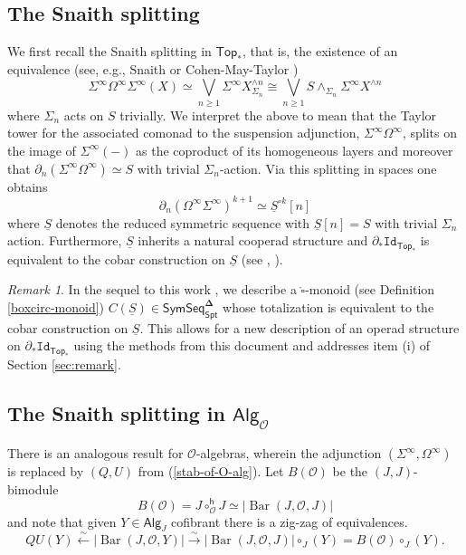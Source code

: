 \documentclass[11pt]{amsart}
\theoremstyle{definition}
\theoremstyle{remark}
\newtheorem{remark}[subsection]{Remark}
\newcommand{\Top}{\mathsf{Top}_*}
\newcommand{\Spt}{\mathsf{Spt}}
\newcommand{\Sp}{\Sigma^{\infty}}
\newcommand{\U}{\Omega^{\infty}}
\newcommand{\Alg}[1]{ {\mathsf{Alg}_{\mathcal{#1}}} }
\newcommand{\SymSeq}{\mathsf{SymSeq}}
\newcommand{\Id}{\mathtt{Id}}
\newcommand{\Barr}{\operatorname{Bar}}
\newcommand{\Cal}[1]{\mathcal{#1}}
\newcommand{\boxcirc}{\mathring{\square}}
\newcommand{\bdel}{\mathbf{\Delta}}
\begin{document}
\subsection{The Snaith splitting} 
We first recall the Snaith splitting in $\Top$, that is, the existence of an equivalence (see, e.g.,  Snaith \cite{Snaith} or Cohen-May-Taylor \cite{Coh-May-Tay}) \begin{equation} \label{eq:Snaith-top}
    \Sp \U \Sp (X)\simeq \bigvee_{n \geq 1} \Sp X^{\wedge n}_{\Sigma_n}\cong \bigvee_{n\geq 1} S\wedge_{\Sigma_n}\Sp X^{\wedge n}
\end{equation} 
where $\Sigma_n$ acts on $S$ trivially. We interpret the above to mean that the Taylor tower for the associated comonad to the suspension adjunction, $\Sp\U$, splits on the image of $\Sp(-)$ as the coproduct of its homogeneous layers and moreover that $\partial_n (\Sp \U)\simeq S$ with trivial $\Sigma_n$-action. Via this splitting in spaces one obtains \[\partial_n (\U\Sp)^{k+1}\simeq \underline{S}^{\circ k}[n]\] where $\underline{S}$ denotes the reduced symmetric sequence with $\underline{S}[n]=S$ with trivial $\Sigma_n$ action. Furthermore, $\underline{S}$ inherits a natural cooperad structure and $\partial_* \Id_{\mathsf{Top}_*}$ is equivalent to the cobar construction on $\underline{S}$ (see \cite{AK}, \cite{Ching-thesis}).

\begin{remark} \label{rem:C(S)} In the sequel to this work \cite{Clark-2}, we describe a $\boxcirc$-monoid (see Definition \ref{boxcirc-monoid}) $C(\underline{S})\in \SymSeq_{\Spt}^{\bdel}$  whose totalization is equivalent to the cobar construction on $\underline{S}$. This allows for a new description of an operad structure on $\partial_* \Id_{\Top}$ using the methods from this document and addresses item (i) of Section \ref{sec:remark}.
\end{remark}


\subsection{The Snaith splitting in $\Alg{O}$}
\label{sec:Snaith-O}There is an analogous result for $\Cal{O}$-algebras, wherein the adjunction $(\Sp, \U)$ is replaced by $(Q, U)$ from (\ref{stab-of-O-alg}). Let $B(\Cal{O})$ be the $(J,J)$-bimodule \[B(\Cal{O})= J\circ^{\mathsf{h}}_{\Cal{O}}J\simeq |\Barr(J,\Cal{O},J)|\] and note that given $Y\in \mathsf{Alg}_J$ cofibrant there is a zig-zag of equivalences. 
\[ QU(Y) \xleftarrow{\sim} |\Barr(J, \Cal{O}, Y)| \xrightarrow{\sim} |\Barr(J, \Cal{O}, J)| \circ_J (Y)= B(\Cal{O}) \circ_J (Y).\]
\end{document}
